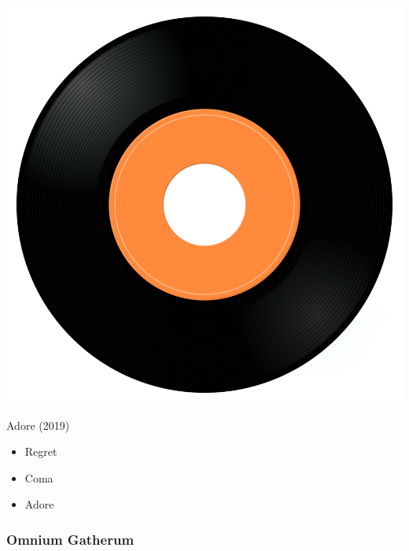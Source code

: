 \begin{minipage}[t]{0.25\textwidth}\vspace{0pt}
\captionsetup{type=figure}
\includegraphics[width=\textwidth]{Images/cover.png}
\caption*{Adore (2019)}
\end{minipage}
\begin{minipage}[t]{0.25\textwidth}\vspace{0pt}
\begin{itemize}[nosep,leftmargin=1em,labelwidth=*,align=left]
	\setlength{\itemsep}{0pt}
	\item Regret
	\item Coma
	\item Adore
\end{itemize}
\end{minipage}

\subsubsection{Omnium Gatherum}

